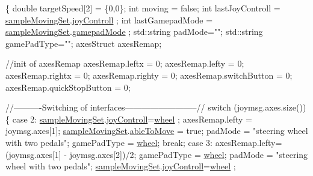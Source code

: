 \begin{DoxyCode}
\{
    \textcolor{keywordtype}{double} targetSpeed[2] = \{0,0\};
    \textcolor{keywordtype}{int} moving = \textcolor{keyword}{false};
    \textcolor{keywordtype}{int} lastJoyControll = \hyperlink{classSampleMoving_af9c7dc0be1c4197469fbfa7aa105f1cc}{sampleMovingSet}.\hyperlink{structSampleMoving_1_1sampleMovingSettingStruct_abcbeb9363905012770950c4908a4e1aa}{joyControll}
      ;
    \textcolor{keywordtype}{int} lastGamepadMode = \hyperlink{classSampleMoving_af9c7dc0be1c4197469fbfa7aa105f1cc}{sampleMovingSet}.\hyperlink{structSampleMoving_1_1sampleMovingSettingStruct_a1b3cbdffd2c270871b009022b1f65eb0}{gamepadMode}
      ;
    std::string padMode=\textcolor{stringliteral}{""};
    std::string gamePadType=\textcolor{stringliteral}{""};
    axesStruct axesRemap;

    \textcolor{comment}{//init of axesRemap}
    axesRemap.leftx = 0;
    axesRemap.lefty = 0;
    axesRemap.rightx = 0;
    axesRemap.righty = 0;
    axesRemap.switchButton = 0;
    axesRemap.quickStopButton = 0;

\textcolor{comment}{//----------Switching of interfaces--------------------------//}
    \textcolor{keywordflow}{switch} (joymsg.axes.size()) \{
        \textcolor{keywordflow}{case} 2: \hyperlink{classSampleMoving_af9c7dc0be1c4197469fbfa7aa105f1cc}{sampleMovingSet}.\hyperlink{structSampleMoving_1_1sampleMovingSettingStruct_abcbeb9363905012770950c4908a4e1aa}{joyControll}=\hyperlink{classSampleMoving_ad495d48e1ec2093a36601548bfad852da003251f50ad3e22d0ab96167b517d017}{wheel}
      ;
                axesRemap.lefty = joymsg.axes[1];
                \hyperlink{classSampleMoving_af9c7dc0be1c4197469fbfa7aa105f1cc}{sampleMovingSet}.\hyperlink{structSampleMoving_1_1sampleMovingSettingStruct_a14089eeff8e96683e056b50c6ae6a998}{ableToMove} = \textcolor{keyword}{true};
                padMode = \textcolor{stringliteral}{"steering wheel with two pedals"};
                gamePadType = \hyperlink{classSampleMoving_ad495d48e1ec2093a36601548bfad852da003251f50ad3e22d0ab96167b517d017}{wheel};
                \textcolor{keywordflow}{break};
        \textcolor{keywordflow}{case} 3: axesRemap.lefty=(joymsg.axes[1] - joymsg.axes[2])/2;
                gamePadType = \hyperlink{classSampleMoving_ad495d48e1ec2093a36601548bfad852da003251f50ad3e22d0ab96167b517d017}{wheel};
                padMode = \textcolor{stringliteral}{"steering wheel with two pedals"};
                \hyperlink{classSampleMoving_af9c7dc0be1c4197469fbfa7aa105f1cc}{sampleMovingSet}.\hyperlink{structSampleMoving_1_1sampleMovingSettingStruct_abcbeb9363905012770950c4908a4e1aa}{joyControll}=\hyperlink{classSampleMoving_ad495d48e1ec2093a36601548bfad852da003251f50ad3e22d0ab96167b517d017}{wheel}
      ;


\end{DoxyCode}
